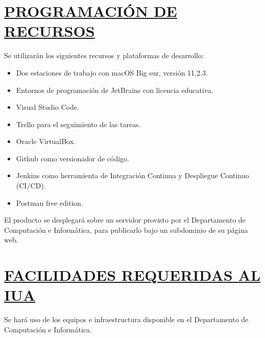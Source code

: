 \section*{\underline{PROGRAMACIÓN DE RECURSOS}}
Se utilizarán los siguientes recursos y plataformas de desarrollo:
\begin{itemize}
	\item Dos estaciones de trabajo con macOS Big sur, versión 11.2.3.
	\item Entornos de programación de JetBrains con licencia educativa.
	\item Visual Studio Code.
	\item Trello para el seguimiento de las tareas.
	\item Oracle VirtualBox.
	\item Github como versionador de código.
	\item Jenkins como herramienta de Integración Continua y Despliegue Continuo (CI/CD).
	\item Postman free edition.
\end{itemize}

El producto se desplegará sobre un servidor provisto por el Departamento de Computación e Informática, para publicarlo bajo un subdominio de su página web.\\

\section*{\underline{FACILIDADES REQUERIDAS AL IUA}}
Se hará uso de los equipos e infraestructura disponible en el Departamento de Computación e Informática.\\



